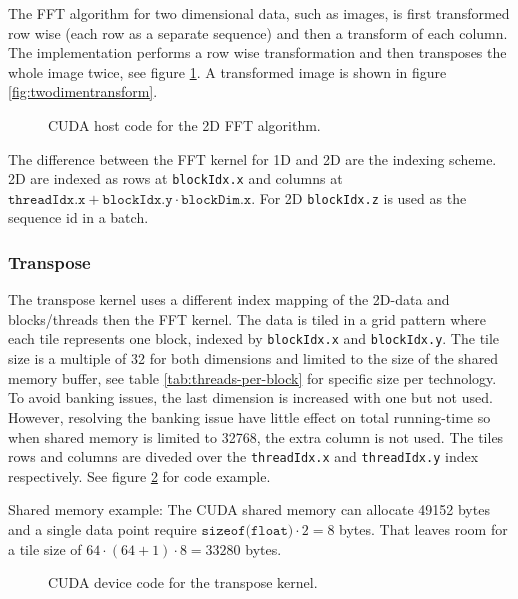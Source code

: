 The FFT algorithm for two dimensional data, such as images, is first transformed row wise (each row as a separate sequence) and then a transform of each column. The implementation performs a row wise transformation and then transposes the whole image twice, see figure \ref{lst:cuda:host-2d-example}. A transformed image is shown in figure \ref{fig:twodimentransform}.

\begin{figure}[htbp]
	\centering
	\begin{framed}
			
	\end{framed}
	\caption{CUDA host code for the 2D FFT algorithm.}
	\label{lst:cuda:host-2d-example}	
\end{figure}

The difference between the FFT kernel for 1D and 2D are the indexing scheme. 2D are indexed as rows at \texttt{blockIdx.x} and columns at $\texttt{threadIdx.x} + \texttt{blockIdx.y} \cdot \texttt{blockDim.x}$. For 2D \texttt{blockIdx.z} is used as the sequence id in a batch.

\subsubsection{Transpose}

The transpose kernel uses a different index mapping of the 2D-data and blocks/threads then the FFT kernel. The data is tiled in a grid pattern where each tile represents one block, indexed by \texttt{blockIdx.x} and \texttt{blockIdx.y}. The tile size is a multiple of 32 for both dimensions and limited to the size of the shared memory buffer, see table \ref{tab:threads-per-block} for specific size per technology. To avoid banking issues, the last dimension is increased with one but not used. However, resolving the banking issue have little effect on total running-time so when shared memory is limited to 32768, the extra column is not used. The tiles rows and columns are diveded over the \texttt{threadIdx.x} and \texttt{threadIdx.y} index respectively. See figure \ref{lst:cuda:device-transpose} for code example.

Shared memory example: The CUDA shared memory can allocate 49152 bytes and a single data point require $\texttt{sizeof(float)} \cdot 2 = 8$ bytes. That leaves room for a tile size of $64 \cdot (64 + 1) \cdot 8 = 33280$ bytes.

\begin{figure}[H]
	\centering
	\begin{framed}
			
	\end{framed}
	\caption{CUDA device code for the transpose kernel.}
	\label{lst:cuda:device-transpose}	
\end{figure}

